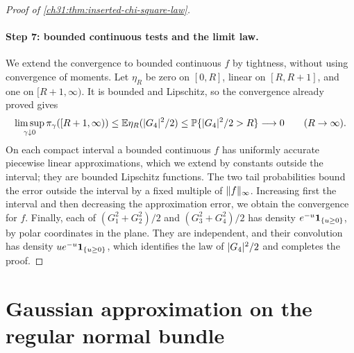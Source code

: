 \begin{proof}[Proof of \cref{ch31:thm:inserted-chi-square-law}]
\paragraph{Step 7: bounded continuous tests and the limit law.}
We extend the convergence to bounded continuous $f$ by tightness, without using convergence of moments. Let $\eta_R$ be zero on $[0,R]$, linear on $[R,R+1]$, and one on $[R+1,\infty)$. It is bounded and Lipschitz, so the convergence already proved gives
\[
 \limsup_{\gamma\downarrow0}\pi_\gamma([R+1,\infty))\le\mathbb E\eta_R(\lvert G_4\rvert^2/2)\le\mathbb P\{\lvert G_4\rvert^2/2>R\}\longrightarrow0\qquad(R\to\infty).
\]
On each compact interval a bounded continuous $f$ has uniformly accurate piecewise linear approximations, which we extend by constants outside the interval; they are bounded Lipschitz functions. The two tail probabilities bound the error outside the interval by a fixed multiple of $\lVert f\rVert_\infty$. Increasing first the interval and then decreasing the approximation error, we obtain the convergence for $f$. Finally, each of $(G_1^2+G_2^2)/2$ and $(G_3^2+G_4^2)/2$ has density $e^{-u}\mathbf 1_{\{u\ge0\}}$, by polar coordinates in the plane. They are independent, and their convolution has density $ue^{-u}\mathbf 1_{\{u\ge0\}}$, which identifies the law of $\lvert G_4\rvert^2/2$ and completes the proof.
\end{proof}

\section{Gaussian approximation on the regular normal bundle}\label{ch31:sec:invariant-normal-bundle-addendum}

